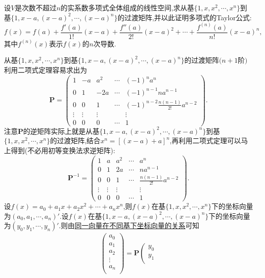 \documentclass[lang=cn,newtx,10pt,scheme=chinese]{elegantbook}
\begin{document}
\begin{example}
设\(V\)是次数不超过\(n\)的实系数多项式全体组成的线性空间,求从基\(\{1,x,x^2,\cdots,x^n\}\)到基\(\{1,x - a,(x - a)^2,\cdots,(x - a)^n\}\)的过渡矩阵,并以此证明多项式的Taylor公式:
\[
f(x)=f(a)+\frac{f'(a)}{1!}(x - a)+\frac{f''(a)}{2!}(x - a)^2+\cdots+\frac{f^{(n)}(a)}{n!}(x - a)^n,
\]
其中\(f^{(n)}(x)\)表示\(f(x)\)的\(n\)次导数.
\end{example}
\begin{solution}
从基\(\{1,x,x^2,\cdots,x^n\}\)到基\(\{1,x - a,(x - a)^2,\cdots,(x - a)^n\}\)的过渡矩阵\((n + 1\)阶\()\)利用二项式定理容易求出为
\[
\boldsymbol{P}=\begin{pmatrix}
1&-a&a^2&\cdots&(-1)^na^n\\
0&1&-2a&\cdots&(-1)^{n - 1}na^{n - 1}\\
0&0&1&\cdots&(-1)^{n - 2}\frac{n(n - 1)}{2!}a^{n - 2}\\
\vdots&\vdots&\vdots&&\vdots\\
0&0&0&\cdots&1
\end{pmatrix}.
\]
注意\(\boldsymbol{P}\)的逆矩阵实际上就是从基\(\{1,x - a,(x - a)^2,\cdots,(x - a)^n\}\)到基\(\{1,x,x^2,\cdots,x^n\}\)的过渡矩阵,结合$x^n=[(x-a)+a]^n$,再利用二项式定理可以马上得到(不必用初等变换法求逆矩阵):
\[
\boldsymbol{P}^{-1}=\begin{pmatrix}
1&a&a^2&\cdots&a^n\\
0&1&2a&\cdots&na^{n - 1}\\
0&0&1&\cdots&\frac{n(n - 1)}{2!}a^{n - 2}\\
\vdots&\vdots&\vdots&&\vdots\\
0&0&0&\cdots&1
\end{pmatrix}.
\]
设\(f(x)=a_0 + a_1x + a_2x^2+\cdots + a_nx^n\),则\(f(x)\)在基\(\{1,x ,x^2,\cdots,x^n\}\)下的坐标向量为$(a_0,a_1,\cdots,a_n)'$.设\(f(x)\)在基\(\{1,x - a,(x - a)^2,\cdots,(x - a)^n\}\)下的坐标向量为$(y_0,y_1,\cdots,y_n)'$.则由\hyperref[theorem:同一向量在不同基下坐标向量的关系]{同一向量在不同基下坐标向量的关系}可知
\begin{align*}
\left( \begin{array}{c}
a_0\\
a_1\\
a_2\\
\vdots\\
a_n\\
\end{array} \right) =\boldsymbol{P}\left( \begin{array}{c}
y_0\\
y_1\\

\end{array}
\end{align*}
\end{solution}
\end{document}
